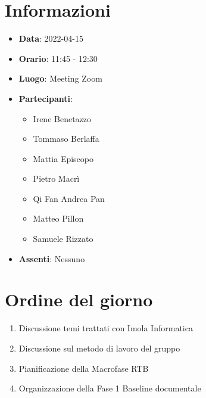 \section{Informazioni}
	\begin{itemize}
		\item \textbf{Data}: 2022-04-15
		\item \textbf{Orario}: 11:45 - 12:30
		\item \textbf{Luogo}: Meeting Zoom
		\item \textbf{Partecipanti}:
		\begin{itemize}
			\item Irene Benetazzo
			\item Tommaso Berlaffa
			\item Mattia Episcopo
			\item Pietro Macrì
			\item Qi Fan Andrea Pan
			\item Matteo Pillon
			\item Samuele Rizzato
		\end{itemize}
        \item \textbf{Assenti}: Nessuno
	\end{itemize}
    
	\section{Ordine del giorno}
	\begin{enumerate}
		\item Discussione temi trattati con Imola Informatica
		\item Discussione sul metodo di lavoro del gruppo
		\item Pianificazione della Macrofase RTB
		\item Organizzazione della Fase 1 Baseline documentale
	\end{enumerate}
	\newpage